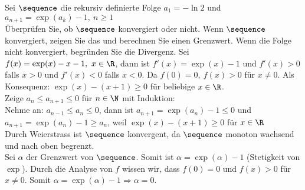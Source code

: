\begin{example}
	Sei $\sequence$ die rekursiv definierte Folge $a_1 = -\ln 2$ und\\$a_{n+1} = \exp (a_k) - 1, ~ n \geq 1$\\
	Überprüfen Sie, ob $\sequence$ konvergiert oder nicht. Wenn $\sequence$ konvergiert, zeigen Sie das und
	berechnen Sie einen Grenzwert. Wenn die Folge nicht konvergiert, begründen Sie die Divergenz.
	\tcblower
	Sei $f(x) = \exp(x) -x -1,~ x \in \R$, dann ist $f'(x) = \exp(x) -1$ und $f'(x) > 0$ falls $x > 0$ und $f'(x) <
	0$ falls $x < 0$. Da $f(0) = 0,~ f(x) > 0$ für $x \neq 0$. Als Konsequenz: $\exp(x) - (x+1) \geq 0$ für
	beliebige $x \in \R$.\\
	Zeige $a_n \leq a_{n+1} \leq 0$ für $n \in \N$ mit Induktion:\\
	Nehme an: $a_{n-1} \leq a_n \leq 0$, dann ist $a_{n+1} = \exp(a_n) - 1 \leq 0$ und $a_{n+1} = \exp (a_n) - 1
	\geq a_n$, weil $\exp(x) - (x+1) \geq 0$ für $x \in \R$\\
	Durch Weierstrass ist $\sequence$ konvergent, da $\sequence$ monoton wachsend und nach oben begrenzt.\\
	Sei $\alpha$ der Grenzwert von $\sequence$. Somit ist $\alpha = \exp(\alpha) - 1$ (Stetigkeit von $\exp$). Durch
	die Analyse von $f$ wissen wir, dass $f(0) = 0$ und $f(x) > 0$ für $x \neq 0$. Somit $\alpha = \exp(\alpha) - 1
	\Rightarrow \alpha = 0$.
\end{example}